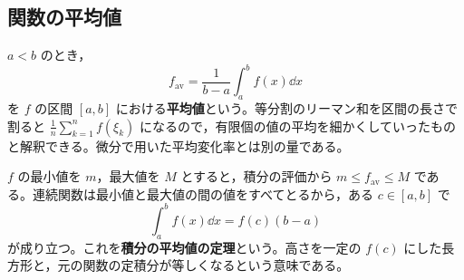 \subsection{関数の平均値}
$a<b$ のとき，
\[
 f_{\mathrm{av}}=\frac1{b-a}\int_a^b f(x)\dd x
\]
を $f$ の区間 $[a,b]$ における\textbf{平均値}という。等分割のリーマン和を区間の長さで割ると $\frac1n\sum_{k=1}^{n}f(\xi_k)$ になるので，有限個の値の平均を細かくしていったものと解釈できる。微分で用いた平均変化率とは別の量である。

$f$ の最小値を $m$，最大値を $M$ とすると，積分の評価から $m\le f_{\mathrm{av}}\le M$ である。連続関数は最小値と最大値の間の値をすべてとるから，ある $c\in[a,b]$ で
\[
 \int_a^b f(x)\dd x=f(c)(b-a)
\]
が成り立つ。これを\textbf{積分の平均値の定理}という。高さを一定の $f(c)$ にした長方形と，元の関数の定積分が等しくなるという意味である。

